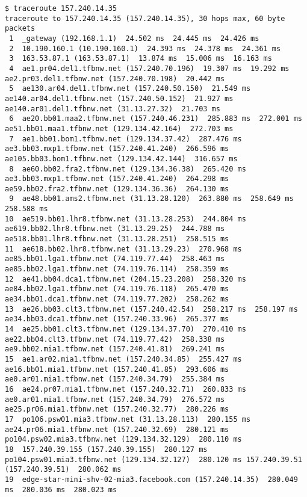 \documentclass[a4paper]{article}
\begin{document}
\begin{lstlisting}
$ traceroute 157.240.14.35
traceroute to 157.240.14.35 (157.240.14.35), 30 hops max, 60 byte packets
 1  _gateway (192.168.1.1)  24.502 ms  24.445 ms  24.426 ms
 2  10.190.160.1 (10.190.160.1)  24.393 ms  24.378 ms  24.361 ms
 3  163.53.87.1 (163.53.87.1)  13.874 ms  15.006 ms  16.163 ms
 4  ae1.pr04.del1.tfbnw.net (157.240.70.196)  19.307 ms  19.292 ms ae2.pr03.del1.tfbnw.net (157.240.70.198)  20.442 ms
 5  ae130.ar04.del1.tfbnw.net (157.240.50.150)  21.549 ms ae140.ar04.del1.tfbnw.net (157.240.50.152)  21.927 ms ae140.ar01.del1.tfbnw.net (31.13.27.32)  21.703 ms
 6  ae20.bb01.maa2.tfbnw.net (157.240.46.231)  285.883 ms  272.001 ms ae51.bb01.maa1.tfbnw.net (129.134.42.164)  272.703 ms
 7  ae1.bb01.bom1.tfbnw.net (129.134.37.42)  287.476 ms ae3.bb03.mxp1.tfbnw.net (157.240.41.240)  266.596 ms ae105.bb03.bom1.tfbnw.net (129.134.42.144)  316.657 ms
 8  ae60.bb02.fra2.tfbnw.net (129.134.36.38)  265.420 ms ae3.bb03.mxp1.tfbnw.net (157.240.41.240)  264.298 ms ae59.bb02.fra2.tfbnw.net (129.134.36.36)  264.130 ms
 9  ae48.bb01.ams2.tfbnw.net (31.13.28.120)  263.880 ms  258.649 ms  258.588 ms
10  ae519.bb01.lhr8.tfbnw.net (31.13.28.253)  244.804 ms ae619.bb02.lhr8.tfbnw.net (31.13.29.25)  244.788 ms ae518.bb01.lhr8.tfbnw.net (31.13.28.251)  258.515 ms
11  ae618.bb02.lhr8.tfbnw.net (31.13.29.23)  270.968 ms ae85.bb01.lga1.tfbnw.net (74.119.77.44)  258.463 ms ae85.bb02.lga1.tfbnw.net (74.119.76.114)  258.359 ms
12  ae41.bb04.dca1.tfbnw.net (204.15.23.208)  258.320 ms ae84.bb02.lga1.tfbnw.net (74.119.76.118)  265.470 ms ae34.bb01.dca1.tfbnw.net (74.119.77.202)  258.262 ms
13  ae26.bb03.clt3.tfbnw.net (157.240.42.54)  258.217 ms  258.197 ms ae34.bb03.dca1.tfbnw.net (157.240.33.96)  265.377 ms
14  ae25.bb01.clt3.tfbnw.net (129.134.37.70)  270.410 ms ae22.bb04.clt3.tfbnw.net (74.119.77.42)  258.338 ms ae9.bb02.mia1.tfbnw.net (157.240.41.81)  269.241 ms
15  ae1.ar02.mia1.tfbnw.net (157.240.34.85)  255.427 ms ae16.bb01.mia1.tfbnw.net (157.240.41.85)  293.606 ms ae0.ar01.mia1.tfbnw.net (157.240.34.79)  255.384 ms
16  ae24.pr07.mia1.tfbnw.net (157.240.32.71)  260.833 ms ae0.ar01.mia1.tfbnw.net (157.240.34.79)  276.572 ms ae25.pr06.mia1.tfbnw.net (157.240.32.77)  280.226 ms
17  po106.psw01.mia3.tfbnw.net (31.13.28.113)  280.155 ms ae24.pr06.mia1.tfbnw.net (157.240.32.69)  280.121 ms po104.psw02.mia3.tfbnw.net (129.134.32.129)  280.110 ms
18  157.240.39.155 (157.240.39.155)  280.127 ms po104.psw01.mia3.tfbnw.net (129.134.32.127)  280.120 ms 157.240.39.51 (157.240.39.51)  280.062 ms
19  edge-star-mini-shv-02-mia3.facebook.com (157.240.14.35)  280.049 ms  280.036 ms  280.023 ms


\end{lstlisting}
\end{document}
